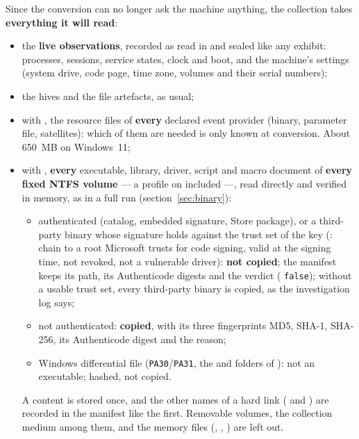 \documentclass[11pt,a4paper,oneside]{report}
\begin{document}
Since the conversion can no longer ask the machine anything, the collection
takes \textbf{everything it will read}:
\begin{itemize}
  \item the \textbf{live observations}, recorded as read in
         and sealed like any exhibit:
        processes, sessions, service states, clock and boot, and the machine's
        settings (system drive, code page, time zone, volumes and their serial
        numbers);
  \item the hives and the file artefacts, as usual;
  \item with , the resource files of \textbf{every} declared event
        provider (binary, parameter file,  satellites): which of
        them are needed is only known at conversion. About 650~MB on
        Windows~11;
  \item with , \textbf{every} executable, library, driver, script
        and macro document of \textbf{every fixed NTFS volume} — a profile on
         included —, read directly and verified in memory, as in a
        full run (section~\ref{sec:binary}):
        \begin{itemize}
          \item authenticated (catalog, embedded signature, Store package), or a
                third-party binary whose signature holds against the trust set of
                the key (: chain to a root Microsoft trusts for
                code signing, valid at the signing time, not revoked, not a
                vulnerable driver): \textbf{not copied}; the manifest keeps its
                path, its Authenticode digests and the verdict
                ( \texttt{false}); without a usable trust
                set, every third-party binary is copied, as the investigation log
                says;
          \item not authenticated: \textbf{copied}, with its three fingerprints
                MD5, SHA-1, SHA-256, its Authenticode digest and the reason;
          \item Windows differential file (\texttt{PA30}/\texttt{PA31}, the
                 and  folders of ): not an
                executable; hashed, not copied.
        \end{itemize}
        A content is stored once, and the other names of a hard link
        ( and ) are recorded in the manifest
        like the first. Removable volumes, the collection medium among them,
        and the memory files (, ,
        ) are left out.
\end{itemize}
\end{document}

